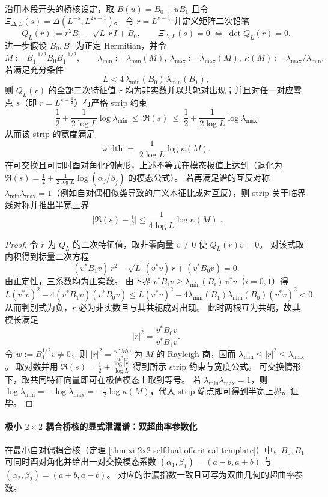 \begin{theorem}\label{thm:xi-qep-noncommuting-cond-bound}
沿用本段开头的桥核设定，取 \(B(u)=B_0+uB_1\) 且令 \(\Xi_{\Delta,L}(s)=\Delta(L^{-s},L^{2s-1})\)。
令 \(r=L^{s-\frac12}\) 并定义矩阵二次铅笔
\[
Q_L(r):=r^2B_1-\sqrt L\,r\,I+B_0,
\qquad
\Xi_{\Delta,L}(s)=0\ \Longleftrightarrow\ \det Q_L(r)=0.
\]
进一步假设 \(B_0,B_1\) 为正定 Hermitian，并令
\[
M:=B_1^{-1/2}B_0B_1^{-1/2},
\qquad
\lambda_{\min}:=\lambda_{\min}(M),\ \lambda_{\max}:=\lambda_{\max}(M),\ 
\kappa(M):=\lambda_{\max}/\lambda_{\min}.
\]
若满足充分条件
\[
L<4\,\lambda_{\min}(B_0)\,\lambda_{\min}(B_1),
\]
则 \(Q_L(r)\) 的全部二次特征值 \(r\) 均为非实数并以共轭对出现；并且对任一对应零点 \(s\)（即 \(r=L^{s-\frac12}\)）有严格 strip 约束
\[
\boxed{\;
\frac12+\frac{1}{2\log L}\log\lambda_{\min}
\ \le\ 
\Re(s)
\ \le\
\frac12+\frac{1}{2\log L}\log\lambda_{\max}\;}
\]
从而该 strip 的宽度满足
\[
\mathrm{width}
\;=\;
\frac{1}{2\log L}\log\kappa(M).
\]
在可交换且可同时酉对角化的情形，上述不等式在模态极值上达到（退化为 \(\Re(s)=\frac12+\frac{1}{2\log L}\log(\alpha_j/\beta_j)\) 的模态公式）。
若再满足谱的互反对称 \(\lambda_{\min}\lambda_{\max}=1\)（例如自对偶相似类导致的广义本征比成对互反），则 strip 关于临界线对称并推出半宽上界
\[
\boxed{\;
\bigl|\Re(s)-\tfrac12\bigr|
\le
\frac{1}{4\log L}\log\kappa(M)\; }.
\]
\end{theorem}

\begin{proof}
令 \(r\) 为 \(Q_L\) 的二次特征值，取非零向量 \(v\neq 0\) 使 \(Q_L(r)v=0\)。
对该式取内积得到标量二次方程
\[
(v^\ast B_1v)\,r^2-\sqrt L\,(v^\ast v)\,r+(v^\ast B_0v)=0.
\]
由正定性，三系数均为正实数。
由下界 \(v^\ast B_i v\ge \lambda_{\min}(B_i)\,v^\ast v\)（\(i=0,1\)）得
\[
L(v^\ast v)^2-4(v^\ast B_1v)(v^\ast B_0v)
\le
L(v^\ast v)^2-4\lambda_{\min}(B_1)\lambda_{\min}(B_0)(v^\ast v)^2<0,
\]
从而判别式为负，\(r\) 必为非实数且与其共轭成对出现。
此时两根互为共轭，故其模长满足
\[
|r|^2=\frac{v^\ast B_0v}{v^\ast B_1v}.
\]
令 \(w:=B_1^{1/2}v\neq 0\)，则
\(
|r|^2=\frac{w^\ast Mw}{w^\ast w}
\)
为 \(M\) 的 Rayleigh 商，因而
\(
\lambda_{\min}\le |r|^2\le \lambda_{\max}
\)。
取对数并用 \(\Re(s)=\tfrac12+\frac{\log|r|}{\log L}\) 得到所示 strip 约束与宽度公式。
可交换情形下，取共同特征向量即可在极值模态上取到等号。
若 \(\lambda_{\min}\lambda_{\max}=1\)，则 \(\log\lambda_{\min}=-\log\lambda_{\max}=-\frac12\log\kappa(M)\)，代入 strip 端点即可得到半宽上界。证毕。
\end{proof}

\paragraph{极小 \texorpdfstring{$2\times2$}{2x2} 耦合桥核的显式泄漏谱：双超曲率参数化}
在最小自对偶耦合核（定理 \ref{thm:xi-2x2-selfdual-offcritical-template}）中，\(B_0,B_1\) 可同时酉对角化并给出一对交换模态系数
\(
(\alpha_1,\beta_1)=(a-b,a+b)
\)
与
\(
(\alpha_2,\beta_2)=(a+b,a-b)
\)。
对应的泄漏指数一致且可写为双曲几何的超曲率参数。

